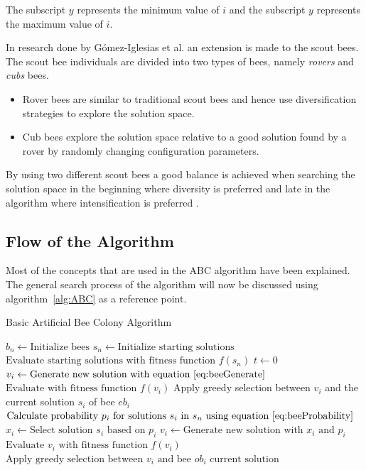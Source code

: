 The subscript $y$ represents the minimum value of $i$ and the subscript $y$ represents the maximum value of $i$.

In research done by G\'{o}mez-Iglesias et al. \cite{ABCFusionGrid} an extension is made to the scout bees. The scout bee individuals are divided into two types of bees, namely \emph{rovers} and \emph{cubs} bees\cite{ABCFusionGrid}.
\begin{itemize}
\item{Rover bees} are similar to traditional scout bees and hence use diversification strategies to explore the solution space. 
\item {Cub bees} explore the solution space relative to a good solution found by a rover by randomly changing configuration parameters. 
\end{itemize}
By using two different scout bees a good balance is achieved when searching the solution space in the beginning where diversity is preferred and late in the algorithm where intensification is preferred \cite{ABCFusionGrid}.
\subsection{Flow of the Algorithm}
Most of the concepts that are used in the \gls{ABC} algorithm have been explained. The general search process of the algorithm will now be discussed using algorithm~\ref{alg:ABC} as a reference point.
\begin{algorithm}[H]
\caption{Basic Artificial Bee Colony Algorithm\cite{ABCCompareStudy}}
\label{alg:ABC}
	\begin{algorithmic}[1]
		\State$b_n \leftarrow \text{Initialize bees}$
		\State$s_n \leftarrow \text{Initialize starting solutions}$
		\State$\text{Evaluate starting solutions with fitness function $f(s_n)$}$
		\State$t \leftarrow 0$
				\State$v_i \leftarrow \text{Generate new solution with equation~\ref{eq:beeGenerate}}$
				\State$\text{Evaluate with fitness function $f(v_i)$}$
				\State Apply greedy selection between $v_i$ and the current solution $s_i$ of bee $eb_i$
			\EndFor
			\State$\text{Calculate probability $p_i$ for solutions $s_i$ in $s_n$ using equation~\ref{eq:beeProbability}}$
				\State$x_i \leftarrow \text{Select solution $s_i$ based on $p_i$} $
				\State$v_i \leftarrow \text{Generate new solution with $x_i$ and $p_i$}$
				\State$\text{Evaluate $v_i$ with fitness function $f(v_i)$}$
				\State$\text{Apply greedy selection between $v_i$ and bee $ob_i$ current solution}$
			\EndFor
	\end{algorithmic}
\end{algorithm}

